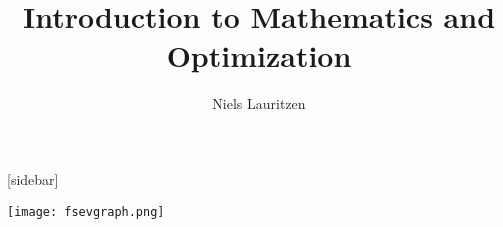 \documentclass{article}
\title{Introduction to Mathematics and Optimization}
\author{Niels Lauritzen}
\begin{document}
[sidebar]

\maketitle

\vspace{2cm}

\texttt{[image: fsevgraph.png]}
\end{document}
